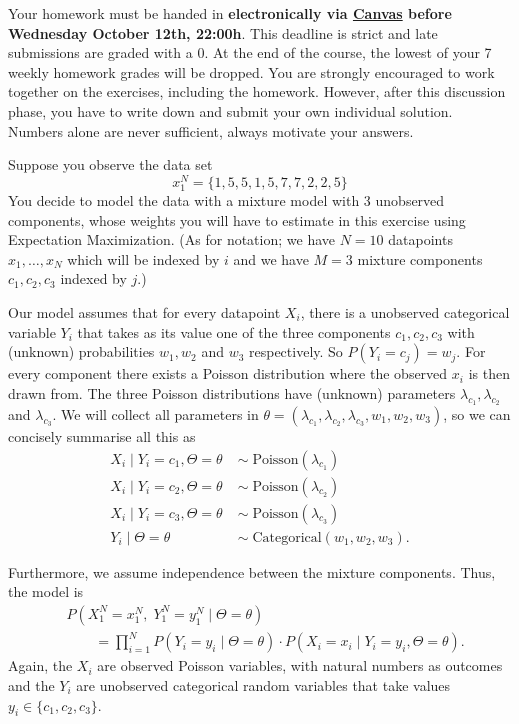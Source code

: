 \documentclass[a4paper,10pt,landscape,twocolumn]{scrartcl}
\newcommand\deadline{Wednesday October 12th, 22:00h}
\begin{document}
\homeworkproblems

{\sffamily\noindent
  Your homework must be handed in \textbf{electronically via
  \href{\canvasURL}{Canvas} before \deadline}. This deadline is strict and late
  submissions are graded with a 0. At the end of the course, the lowest of your
  7 weekly homework grades will be dropped. You are strongly encouraged to work
  together on the exercises, including the homework. However, after this
  discussion phase, you have to write down and submit your own individual
  solution. Numbers alone are never sufficient, always motivate your answers.
}


\begin{exercise}
  Suppose you observe the data set 
  \[
    x_1^N = \{1, 5, 5, 1, 5, 7, 7, 2, 2, 5\}
  \] 
  You decide to model the data with a mixture model with 3 unobserved
  components, whose weights you will have to estimate in this exercise using
  Expectation Maximization. (As for notation; we have $N=10$ datapoints 
  $x_1, \dots, x_N$ which will be indexed by $i$ and we have $M=3$ mixture
  components $c_1, c_2, c_3$ indexed by $j$.)
	
  Our model assumes that for every datapoint $X_i$, there is a unobserved
  categorical variable $Y_i$ that takes as its value one of the three
  components $c_1, c_2, c_3$ with (unknown) probabilities $w_1, w_2$ and $w_3$
  respectively. So $P(Y_i = c_j) = w_j$. For every component there exists a
  Poisson distribution where the observed $x_i$ is then drawn from. The three
  Poisson distributions have (unknown) parameters 
  $\lambda_{c_{1}}, \lambda_{c_{2}}$ and $\lambda_{c_{3}}$. We will collect all
  parameters in $\theta = (\lambda_{c_1}, \lambda_{c_2}, \lambda_{c_3},w_1,
  w_2, w_3)$, so we can concisely summarise all this as
  \begin{align*}
    X_i \mid Y_i = c_1, 
      \Theta=\theta \; &\sim \; \text{Poisson}(\lambda_{c_1})\\
	X_i \mid Y_i = c_2, 
	 \Theta=\theta \; &\sim \; \text{Poisson}(\lambda_{c_2})\\
    X_i \mid Y_i = c_3, 
      \Theta=\theta \; &\sim \; \text{Poisson}(\lambda_{c_3})\\
	Y_i \mid \Theta=\theta \; &\sim \; \text{Categorical}(w_1, w_2, w_3).
  \end{align*}

  Furthermore, we assume independence between the mixture components. Thus, the
  model is
  \begin{align*}
	&P(X_1^N=x_1^N, \;Y_1^N=y_1^N\mid \Theta=\theta) \\
    &\qquad
      = \prod_{i=1}^N P(Y_{i}=y_{i} \mid \Theta=\theta) 
      \cdot P(X_{i}=x_{i}\mid Y_{i}=y_{i}, \Theta=\theta).
  \end{align*}
  Again, the $X_i$ are observed Poisson variables, with natural numbers as
  outcomes and the $Y_i$ are unobserved categorical random variables that take
  values $y_i \in \{c_1, c_2, c_3\}$.
	

\end{exercise}
\end{document}
